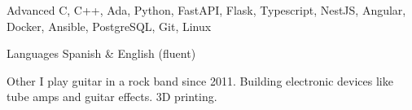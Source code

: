 
\begin{cvskills}

  \cvskill
    {Advanced}
    {C, C++, Ada, Python, FastAPI, Flask, Typescript, NestJS, Angular, Docker, Ansible, PostgreSQL, Git, Linux}

  \cvskill
    {Languages}
    {Spanish \& English (fluent)}

  \cvskill
    {Other}
    {I play guitar in a rock band since 2011. Building electronic devices like tube amps and guitar effects. 3D printing.}

\end{cvskills}
